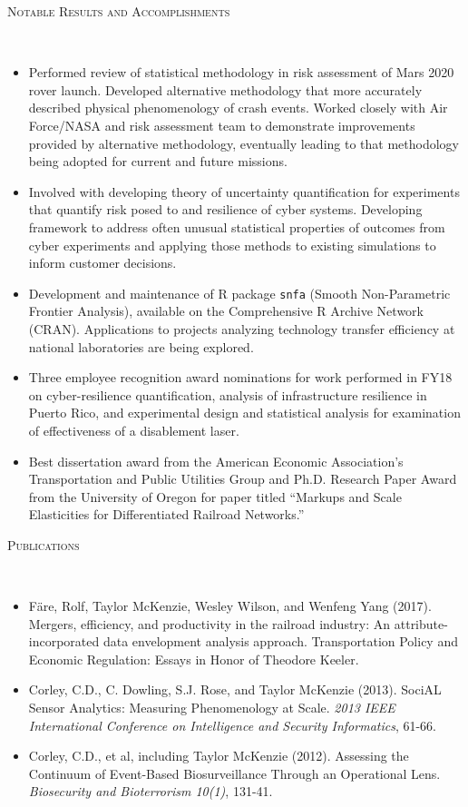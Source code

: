 \documentclass[11pt]{article}
\newenvironment{changemargin}[2]{%
  \begin{list}{}{%
    \setlength{\topsep}{0pt}%
    \setlength{\leftmargin}{#1}%
    \setlength{\rightmargin}{#2}%
    \setlength{\listparindent}{\parindent}%
    \setlength{\itemindent}{\parindent}%
    \setlength{\parsep}{\parskip}%
  }%
  \item[]}{\end{list}
}
\newcommand{\lineover}{
	\begin{changemargin}{-0.05in}{-0.05in}
		\vspace*{-8pt}
		\hrulefill \\
		\vspace*{-2pt}
	\end{changemargin}
}
\newcommand{\header}[1]{
	\begin{changemargin}{-0.5in}{-0.5in}
		\scshape{#1}\\
	\vspace*{-5pt}
  	\lineover
	\end{changemargin}
}
\newenvironment{body} {
	\vspace*{-16pt}
	\begin{changemargin}{-0.25in}{-0.5in}
  }	
	{\end{changemargin}
}
\begin{document}
\smallskip
\header{Notable Results and Accomplishments}
\begin{body}
	\vspace{14pt}
	\begin{itemize}
		\item Performed review of statistical methodology in risk assessment of Mars 2020 rover launch. Developed alternative methodology that more accurately described physical phenomenology of crash events. Worked closely with Air Force/NASA and risk assessment team to demonstrate improvements provided by alternative methodology, eventually leading to that methodology being adopted for current and future missions.
		\item Involved with developing theory of uncertainty quantification for experiments that quantify risk posed to and resilience of cyber systems. Developing framework to address often unusual statistical properties of outcomes from cyber experiments and applying those methods to existing simulations to inform customer decisions.
		\item Development and maintenance of R package \texttt{snfa} (Smooth Non-Parametric Frontier Analysis), available on the Comprehensive R Archive Network (CRAN). Applications to projects analyzing technology transfer efficiency at national laboratories are being explored.
		\item Three employee recognition award nominations for work performed in FY18 on cyber-resilience quantification, analysis of infrastructure resilience in Puerto Rico, and experimental design and statistical analysis for examination of effectiveness of a disablement laser.
		\item Best dissertation award from the American Economic Association's Transportation and Public Utilities Group and Ph.D. Research Paper Award from the University of Oregon for paper titled ``Markups and Scale Elasticities for Differentiated Railroad Networks.''
	\end{itemize}
\end{body}

\smallskip
\vspace*{-5pt}
\header{Publications}
\begin{body}
\vspace{14pt}
\begin{itemize}
	\item F\"{a}re, Rolf, Taylor McKenzie, Wesley Wilson, and Wenfeng Yang (2017). Mergers, efficiency, and productivity in the railroad industry: An attribute-incorporated data envelopment analysis approach. Transportation Policy and Economic Regulation: Essays in Honor of Theodore Keeler.
	\item Corley, C.D., C. Dowling, S.J. Rose, and Taylor McKenzie (2013). SociAL Sensor Analytics: Measuring Phenomenology at Scale. \textit{2013 IEEE International Conference on Intelligence and Security Informatics}, 61-66.
	\item Corley, C.D., et al, including Taylor McKenzie (2012). Assessing the Continuum of Event-Based Biosurveillance Through an Operational Lens. \textit{Biosecurity and Bioterrorism 10(1)}, 131-41.
\end{itemize}
\end{body}
\end{document}
